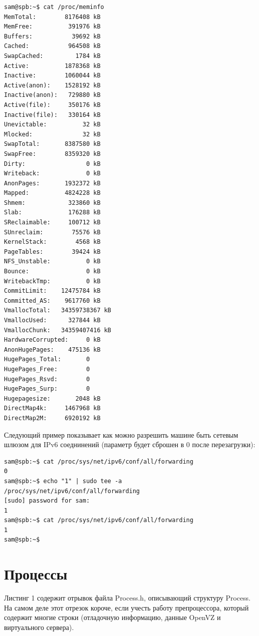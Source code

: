 \documentclass[a4paper, 12pt]{article}		%
\begin{document}
\begin{verbatim}
sam@spb:~$ cat /proc/meminfo 
MemTotal:        8176408 kB
MemFree:          391976 kB
Buffers:           39692 kB
Cached:           964508 kB
SwapCached:         1784 kB
Active:          1878368 kB
Inactive:        1060044 kB
Active(anon):    1528192 kB
Inactive(anon):   729880 kB
Active(file):     350176 kB
Inactive(file):   330164 kB
Unevictable:          32 kB
Mlocked:              32 kB
SwapTotal:       8387580 kB
SwapFree:        8359320 kB
Dirty:                 0 kB
Writeback:             0 kB
AnonPages:       1932372 kB
Mapped:          4824228 kB
Shmem:            323860 kB
Slab:             176288 kB
SReclaimable:     100712 kB
SUnreclaim:        75576 kB
KernelStack:        4568 kB
PageTables:        39424 kB
NFS_Unstable:          0 kB
Bounce:                0 kB
WritebackTmp:          0 kB
CommitLimit:    12475784 kB
Committed_AS:    9617760 kB
VmallocTotal:   34359738367 kB
VmallocUsed:      327844 kB
VmallocChunk:   34359407416 kB
HardwareCorrupted:     0 kB
AnonHugePages:    475136 kB
HugePages_Total:       0
HugePages_Free:        0
HugePages_Rsvd:        0
HugePages_Surp:        0
Hugepagesize:       2048 kB
DirectMap4k:     1467968 kB
DirectMap2M:     6920192 kB
\end{verbatim}

Следующий пример показывает как можно разрешить машине быть сетевым шлюзом для IPv6 соеднинений (параметр будет сброшен в 0 после перезагрузки):

\begin{verbatim}
sam@spb:~$ cat /proc/sys/net/ipv6/conf/all/forwarding
0
sam@spb:~$ echo "1" | sudo tee -a /proc/sys/net/ipv6/conf/all/forwarding
[sudo] password for sam: 
1
sam@spb:~$ cat /proc/sys/net/ipv6/conf/all/forwarding
1
sam@spb:~$
\end{verbatim}


\newpage
\section{Процессы}

Листинг 1 содержит отрывок файла Process.h, описывающий структуру Process. На самом деле этот отрезок короче, если учесть работу препроцессора, который содержит многие строки (отладочную информацию, данные OpenVZ и виртуального сервера).


\end{document}
